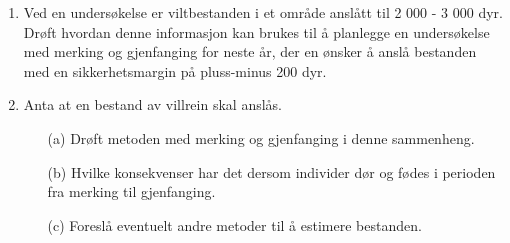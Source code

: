\begin{enumerate}
\item  Ved en undersøkelse er viltbestanden i et område anslått til
2 000 - 3 000 dyr.  Drøft hvordan denne informasjon kan brukes til å
planlegge en undersøkelse med merking og gjenfanging for neste år,
der en ønsker å anslå bestanden med en sikkerhetsmargin på
pluss-minus 200 dyr.

\item  Anta at en bestand av villrein skal anslås.
\begin{itemize}
\item[(a)]  Drøft metoden med merking og gjenfanging i denne sammenheng.
\item[(b)]  Hvilke konsekvenser har det dersom individer dør og fødes
i perioden fra merking til gjenfanging.
\item[(c)]  Foreslå eventuelt andre metoder til å estimere bestanden.
\end{itemize}
\end{enumerate}
\normalsize

 
